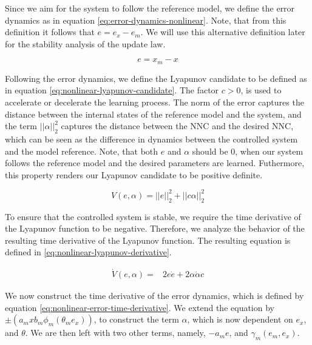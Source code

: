 Since we aim for the system to follow the reference model, we define the error dynamics as in equation \eqref{eq:error-dynamics-nonlinear}. Note, that from this definition it follows that $e=e_x-e_m$. We will use this alternative definition later for the stability analysis of the update law.

\begin{equation}
    e=x_m-x
    \label{eq:error-dynamics-nonlinear}
\end{equation}

Following the error dynamics, we define the Lyapunov candidate to be defined as in equation \eqref{eq:nonlinear-lyapunov-candidate}. The factor $c>0$, is used to accelerate or decelerate the learning process. The norm of the error captures the distance between the internal states of the reference model and the system, and the term $||\alpha||_2^2$ captures the distance between the NNC and the desired NNC, which can be seen as the difference in dynamics between the controlled system and the model reference. Note, that both $e$ and $\alpha$ should be $0$, when our system follows the reference model and the desired parameters are learned. Futhermore, this property renders our Lyapunov candidate to be positive definite.

\begin{equation}
    V(e, \alpha) =||e||_2^2 + ||c \alpha||_2^2
    \label{eq:nonlinear-lyapunov-candidate}
\end{equation}

To ensure that the controlled system is stable, we require the time derivative of the Lyapunov function to be negative. Therefore, we analyze the behavior of the resulting time derivative of the Lyapunov function. The resulting equation is defined in \eqref{eq:nonlinear-lyapunov-derivative}.

\begin{equation}
    \begin{aligned}
    \dot V(e, \alpha) = & 2e\dot e + 2\alpha \dot \alpha c
    \end{aligned}
    \label{eq:nonlinear-lyapunov-derivative}
\end{equation}

We now construct the time derivative of the error dynamics, which is defined by equation \eqref{eq:nonlinear-error-time-derivative}. We extend the equation by $\pm (a_mx b_m \phi_m(\theta_m e_x))$, to construct the term $\alpha$, which is now dependent on $e_x$, and $\theta$. We are then left with two other terms, namely, $-a_me$, and $\gamma_m(e_m, e_x)$.

